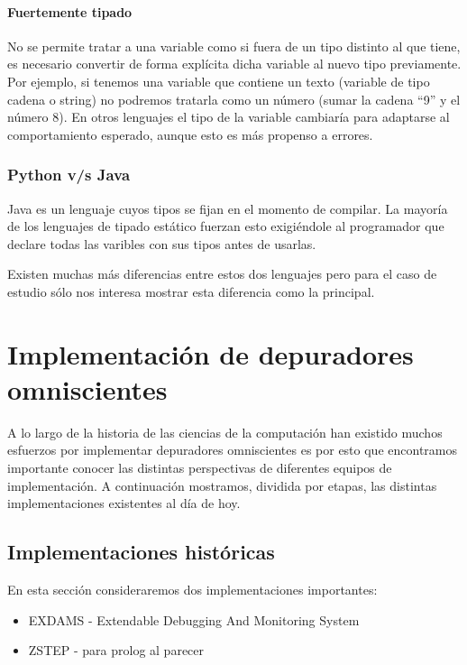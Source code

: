\documentclass[12pt,a4paper]{report}
\begin{document}
			\subsubsection{Fuertemente tipado}

No se permite tratar a una variable como si fuera de un tipo distinto al que tiene, es necesario convertir de forma explícita dicha variable al nuevo tipo previamente. Por ejemplo, si tenemos una variable que contiene un texto (variable de tipo cadena o string) no podremos tratarla como un número (sumar la cadena “9” y el número 8). En otros lenguajes el tipo de la variable cambiaría para adaptarse al comportamiento esperado, aunque esto es más propenso a errores.

		\subsection{Python v/s Java}

Java es un lenguaje cuyos tipos se fijan en el momento de compilar. La mayoría de los lenguajes de tipado estático fuerzan esto exigiéndole al programador que declare todas las varibles con sus tipos antes de usarlas. 

Existen muchas más diferencias entre estos dos lenguajes pero para el caso de estudio sólo nos interesa mostrar esta diferencia como la principal.

\chapter{Implementación de depuradores omniscientes}

A lo largo de la historia de las ciencias de la computación han existido muchos esfuerzos por implementar depuradores omniscientes es por esto que encontramos importante conocer las distintas perspectivas de diferentes equipos de implementación.  A continuación mostramos, dividida por etapas, las distintas implementaciones existentes al día de hoy.

	\section{Implementaciones históricas}

En esta sección consideraremos dos implementaciones importantes:
\begin{itemize}
	\item EXDAMS - Extendable Debugging And Monitoring System
	\item ZSTEP - para prolog al parecer
\end{itemize}
\end{document}
